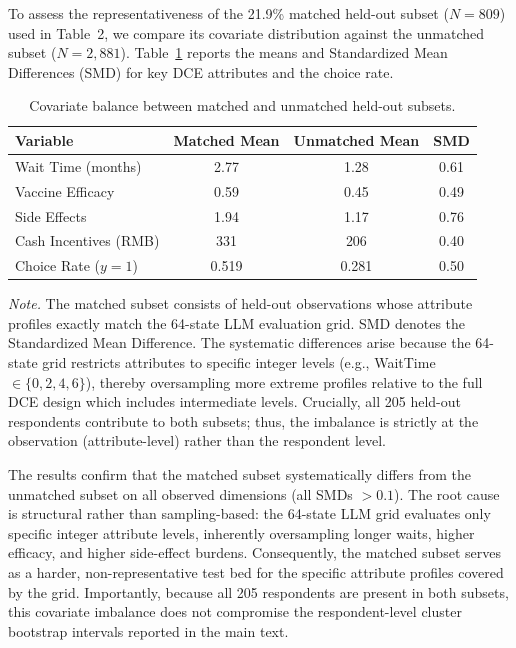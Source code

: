 \documentclass[11pt]{article}
\begin{document}
To assess the representativeness of the 21.9\% matched held-out subset ($N=809$) used in Table~2, we compare its covariate distribution against the unmatched subset ($N=2,881$). Table~\ref{tab:balance_check} reports the means and Standardized Mean Differences (SMD) for key DCE attributes and the choice rate. 

\begin{table}[h]
\centering
\caption{Covariate balance between matched and unmatched held-out subsets.}
\label{tab:balance_check}
\small
\begin{tabular}{l c c c}
\toprule
\textbf{Variable} & \textbf{Matched Mean} & \textbf{Unmatched Mean} & \textbf{SMD} \\
\midrule
Wait Time (months) & 2.77 & 1.28 & 0.61 \\
Vaccine Efficacy & 0.59 & 0.45 & 0.49 \\
Side Effects & 1.94 & 1.17 & 0.76 \\
Cash Incentives (RMB) & 331 & 206 & 0.40 \\
Choice Rate ($y=1$) & 0.519 & 0.281 & 0.50 \\
\bottomrule
\end{tabular}
\vspace{0.4em}
\begin{minipage}{0.95\textwidth}
\small
\textit{Note.} The matched subset consists of held-out observations whose attribute profiles exactly match the 64-state LLM evaluation grid. SMD denotes the Standardized Mean Difference. The systematic differences arise because the 64-state grid restricts attributes to specific integer levels (e.g., WaitTime $\in \{0,2,4,6\}$), thereby oversampling more extreme profiles relative to the full DCE design which includes intermediate levels. Crucially, all 205 held-out respondents contribute to both subsets; thus, the imbalance is strictly at the observation (attribute-level) rather than the respondent level.
\end{minipage}
\end{table}

The results confirm that the matched subset systematically differs from the unmatched subset on all observed dimensions (all SMDs $> 0.1$). The root cause is structural rather than sampling-based: the 64-state LLM grid evaluates only specific integer attribute levels, inherently oversampling longer waits, higher efficacy, and higher side-effect burdens. Consequently, the matched subset serves as a harder, non-representative test bed for the specific attribute profiles covered by the grid. Importantly, because all 205 respondents are present in both subsets, this covariate imbalance does not compromise the respondent-level cluster bootstrap intervals reported in the main text.
\end{document}
